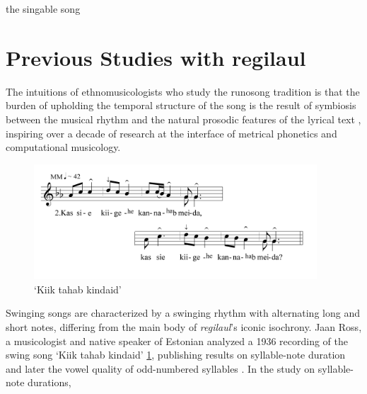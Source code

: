 %
%
%
the singable song \cite{tormis1985}
%
%
% 

 
 
 \cite{tormis2007}






 
\section{Previous Studies with regilaul}



The intuitions of ethnomusicologists who study the runosong tradition is that the burden of upholding the temporal structure of the song is the result of symbiosis between the musical rhythm and the natural prosodic features of the lyrical text \citep{ross1990, tampere1934}, inspiring over a decade of research at the interface of metrical phonetics and computational musicology. 
%
% 



\begin{figure}[htb]
\begin{center}
\includegraphics[width=300pt]{figures/022.png}
\caption{`Kiik tahab kindaid' \cite{}}
\label{022swing}
\end{center}
\end{figure}

Swinging songs are characterized by a swinging rhythm with alternating long and short notes, differing from the main body of {\it regilaul}'s iconic isochrony. 
Jaan Ross, a musicologist and native speaker of Estonian analyzed a 1936 recording of the swing song `Kiik tahab kindaid' \ref{022swing}, publishing results on syllable-note duration \cite{ross1989} and later the vowel quality of odd-numbered syllables \citep{ross90}. In the study on syllable-note durations, 

